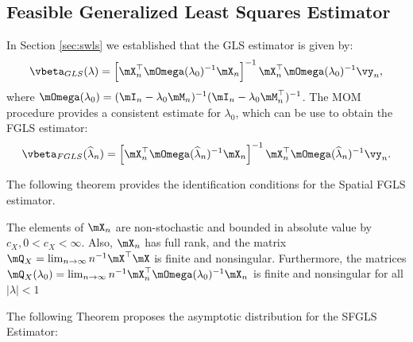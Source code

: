\documentclass[english,12pt]{book}\usepackage[]{graphicx}\usepackage[]{xcolor}
\begin{document}
\subsection{Feasible Generalized Least Squares Estimator}

In Section \ref{sec:swls} we established that the GLS estimator is given by:
\begin{equation}\label{eq:beta_gls_gm}
\vbeta_{GLS}(\lambda) =\left[\mX^\top_n\mOmega(\lambda_0)^{-1}\mX_n\right]^{-1}\mX^\top_n\mOmega(\lambda_0)^{-1}\vy_n,
\end{equation}
%
where $\mOmega(\lambda_0) = (\mI_n - \lambda_0\mM_n)^{-1}(\mI_n - \lambda_0\mM^\top_n)^{-1}$. The MOM procedure provides a consistent estimate for $\lambda_0$, which can be use to obtain the FGLS estimator:
\begin{equation}\label{eq:beta_fgls}
\vbeta_{FGLS}(\widehat{\lambda}_n) =\left[\mX^\top_n\mOmega(\widehat{\lambda}_n)^{-1}\mX_n\right]^{-1}\mX^\top_n\mOmega(\widehat{\lambda}_n)^{-1}\vy_n.
\end{equation}

The following theorem provides the identification conditions for the Spatial FGLS estimator.
\begin{assumption}\label{assu:X_bounded_fgls}
  The elements of $\mX_n$ are non-stochastic and bounded in absolute value by $c_X, 0 < c_X < \infty$. Also, $\mX_n$ has full rank, and the matrix $\mQ_X = \lim_{n\to\infty}n^{-1}\mX^\top\mX$ is finite and nonsingular. Furthermore, the matrices $\mQ_X(\lambda_0) = \lim_{n\to \infty} n^{-1}\mX^\top_n\mOmega(\lambda_0)^{-1}\mX_n$ is finite and nonsingular for all $\left|\lambda\right| < 1$
\end{assumption}

The following Theorem proposes the asymptotic distribution for the SFGLS Estimator:
\end{document}
